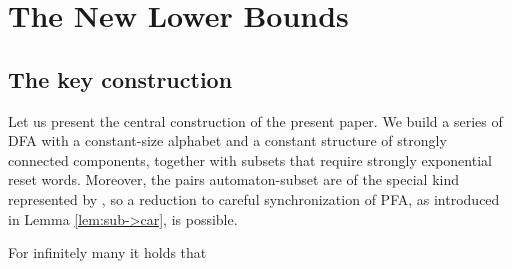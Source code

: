 \documentclass{ws-ijmpc}
\begin{document}
\section{The New Lower Bounds\label{sec:The-New-Lower Bounds}}


\subsection{The key construction}

Let us present the central construction of the present paper. We build
a series of DFA with a constant-size alphabet and a constant structure
of strongly connected components, together with subsets that require
strongly exponential reset words. Moreover, the pairs automaton-subset
are of the special kind represented by ,
so a reduction to careful synchronization of PFA, as introduced in
Lemma \ref{lem:sub->car}, is possible.
\begin{lemma}
\label{lem: de bruijn automaton}For infinitely many  it holds
that

\end{lemma}
\end{document}
